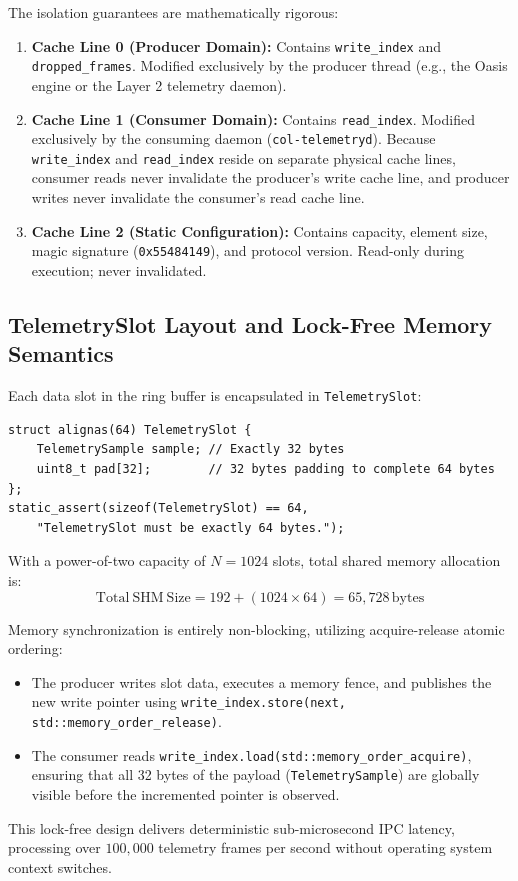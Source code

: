 The isolation guarantees are mathematically rigorous:
\begin{enumerate}
    \item \textbf{Cache Line 0 (Producer Domain):} Contains \texttt{write\_index} and \texttt{dropped\_frames}. Modified exclusively by the producer thread (e.g., the Oasis engine or the Layer 2 telemetry daemon).
    \item \textbf{Cache Line 1 (Consumer Domain):} Contains \texttt{read\_index}. Modified exclusively by the consuming daemon (\texttt{col-telemetryd}). Because \texttt{write\_index} and \texttt{read\_index} reside on separate physical cache lines, consumer reads never invalidate the producer's write cache line, and producer writes never invalidate the consumer's read cache line.
    \item \textbf{Cache Line 2 (Static Configuration):} Contains capacity, element size, magic signature (\texttt{0x55484149}), and protocol version. Read-only during execution; never invalidated.
\end{enumerate}

\subsection{TelemetrySlot Layout and Lock-Free Memory Semantics}

Each data slot in the ring buffer is encapsulated in \texttt{TelemetrySlot}:
\begin{verbatim}
struct alignas(64) TelemetrySlot {
    TelemetrySample sample; // Exactly 32 bytes
    uint8_t pad[32];        // 32 bytes padding to complete 64 bytes
};
static_assert(sizeof(TelemetrySlot) == 64, 
    "TelemetrySlot must be exactly 64 bytes.");
\end{verbatim}

With a power-of-two capacity of $N = 1024$ slots, total shared memory allocation is:
\begin{equation}
\mathrm{Total\ SHM\ Size} = 192 + (1024 \times 64) = 65,728\,\mathrm{bytes}
\label{eq:total_shm_size}
\end{equation}

Memory synchronization is entirely non-blocking, utilizing acquire-release atomic ordering:
\begin{itemize}
    \item The producer writes slot data, executes a memory fence, and publishes the new write pointer using \texttt{write\_index.store(next, std::memory\_order\_release)}.
    \item The consumer reads \texttt{write\_index.load(std::memory\_order\_acquire)}, ensuring that all 32 bytes of the payload (\texttt{TelemetrySample}) are globally visible before the incremented pointer is observed.
\end{itemize}
This lock-free design delivers deterministic sub-microsecond IPC latency, processing over $100,000$ telemetry frames per second without operating system context switches.

